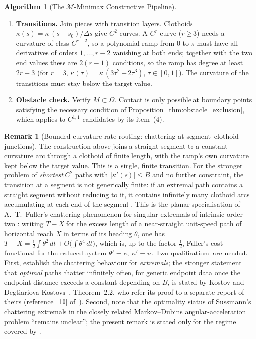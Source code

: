 \documentclass[11pt,reqno]{amsart}
\theoremstyle{definition}
\newtheorem{remark}[theorem]{Remark}
\newtheorem{algorithm}[theorem]{Algorithm}
\numberwithin{equation}{section}
\begin{document}
\begin{algorithm}[The $\mathcal{M}$-Minimax Constructive Pipeline]
\begin{enumerate}
    \item \textbf{Transitions.}
    Join pieces with transition layers. Clothoids $\kappa(s) = \kappa\,(s-s_0)/\Delta s$ give $C^2$ curves. A $C^r$ curve ($r \ge 3$) needs a curvature of class $C^{r-2}$, so a polynomial ramp from $0$ to $\kappa$ must have all derivatives of orders $1, \dots, r-2$ vanishing at both ends; together with the two end values these are $2(r-1)$ conditions, so the ramp has degree at least $2r-3$ (for $r = 3$, $\kappa(\tau) = \kappa\,(3\tau^2 - 2\tau^3)$, $\tau \in [0,1]$). The curvature of the transitions must stay below the target value.

    \item \textbf{Obstacle check.}
    Verify $M \subset \bar\Omega$. Contact is only possible at boundary points satisfying the necessary condition of Proposition~\ref{thm:obstacle_exclusion}, which applies to $C^{1,1}$ candidates by its item~(4).
\end{enumerate}
\end{algorithm}

\begin{remark}[Bounded curvature-rate routing: chattering at segment--clothoid junctions]
\label{rem:fuller_chattering}
The construction above joins a straight segment to a constant-curvature arc through a clothoid
of finite length, with the ramp's own curvature kept below the target value. This is a single,
finite transition. For the stronger problem of \emph{shortest} $C^2$ paths with $|\kappa'(s)|\le B$
and no further constraint, the transition at a segment is not generically finite: if an extremal
path contains a straight segment without reducing to it, it contains infinitely many clothoid arcs
accumulating at each end of the segment \cite{bcl1994,sussmann1997cdc}. This is the planar
specialisation of A.~T.~Fuller's chattering phenomenon for singular extremals of intrinsic order two
\cite{fuller1963,fuller1964,zelikinborisov1994}: writing $T-X$ for the excess length of a near-straight
unit-speed path of horizontal reach $X$ in terms of its heading $\theta$, one has
$T - X = \tfrac12\int\theta^2\,dt + O\!\big(\int\theta^4\,dt\big)$, which is, up to the factor
$\tfrac12$, Fuller's cost functional for the reduced system $\theta'=\kappa,\ \kappa'=u$. Two
qualifications are needed. First, \cite{bcl1994,sussmann1997cdc} establish the chattering behaviour
for \emph{extremals}; the stronger statement that \emph{optimal} paths chatter infinitely often, for
generic endpoint data once the endpoint distance exceeds a constant depending on $B$, is stated by
Kostov and Degtiariova-Kostova~\cite{kostov1995}, Theorem~2.2, who refer its proof to a separate
report of theirs (reference~[10] of~\cite{kostov1995}). Second, \cite{zhutrelatcerf2016} note that
the optimality status of Sussmann's chattering extremals in the closely related Markov--Dubins
angular-acceleration problem ``remains unclear''; the present remark is stated only for the regime
covered by \cite{kostov1995}.
\end{remark}
\end{document}
